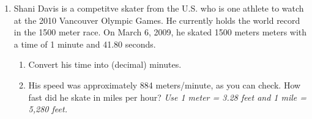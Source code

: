 \documentclass[12pt]{article}
\begin{document}
\begin{enumerate}
\newpage

\item Shani Davis is a competitve skater from the U.S. who is one athlete to watch at the 2010 Vancouver Olympic Games.  He currently holds the world record in the 1500 meter race.  On March 6, 2009, he skated 1500 meters meters with a time of 1 minute and 41.80 seconds.

\begin{enumerate}
\item Convert his time into (decimal) minutes.
\vfill
\vfill
\item His speed was approximately 884 meters/minute, as you can check.  How fast did he skate in miles per hour?  \emph{Use 1 meter = 3.28 feet and 1 mile = 5,280 feet.}
\vfill
\vfill
\vfill
\end{enumerate}

\end{enumerate}
\end{document}
